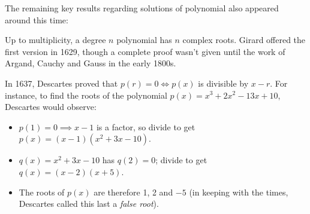 The remaining key results regarding solutions of polynomial also appeared around this time:
\begin{description}\label{pg:factorthm}
	\item[Fundamental Theorem of Algebra] Up to multiplicity, a degree $n$ polynomial has $n$ complex roots. Girard offered the first version in 1629, though a complete proof wasn't given until the work of Argand, Cauchy and Gauss in the early 1800s.
	\item[Factor Theorem] In 1637, Descartes proved that $p(r)=0\iff p(x)$ is divisible by $x-r$.\smallbreak
For instance, to find the roots of the polynomial $p(x)=x^3+2x^2-13x+10$, Descartes would observe:
\begin{itemize}
  \item $p(1)=0\implies x-1$ is a factor, so divide to get $p(x)=(x-1)(x^2+3x-10)$.
  \item $q(x)=x^2+3x-10$ has $q(2)=0$; divide to get $q(x)=(x-2)(x+5)$.
  \item The roots of $p(x)$ are therefore 1, 2 and $-5$ (in keeping with the times, Descartes called this last a \emph{false root}).
\end{itemize}
\end{description}


\clearpage

